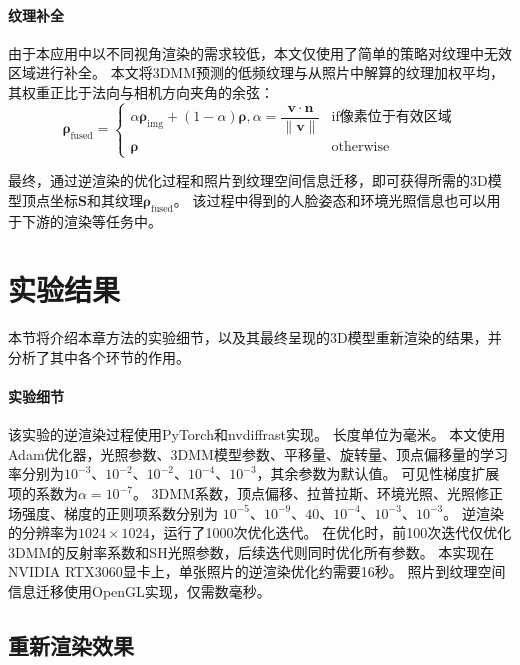 \paragraph{纹理补全}
由于本应用中以不同视角渲染的需求较低，本文仅使用了简单的策略对纹理中无效区域进行补全。
本文将3DMM预测的低频纹理与从照片中解算的纹理加权平均，其权重正比于法向与相机方向夹角的余弦：
\begin{equation}
\mathbf{\rho}_\mathrm{fused} = \begin{cases}
    \alpha \mathbf{\rho}_\mathrm{img} + (1-\alpha) \mathbf{\rho}, \alpha = \dfrac{\mathbf{v}\cdot\mathbf{n}}{\|\mathbf{v}\|} & \text{if像素位于有效区域} \\
\mathbf{\rho} & \text{otherwise}
\end{cases}
\label{eq:texture_fusion}
\end{equation}

最终，通过逆渲染的优化过程和照片到纹理空间信息迁移，即可获得所需的3D模型顶点坐标$\mathbf{S}$和其纹理$\mathbf{\rho}_\mathrm{fused}$。
该过程中得到的人脸姿态和环境光照信息也可以用于下游的渲染等任务中。

\section{实验结果}

本节将介绍本章方法的实验细节，以及其最终呈现的3D模型重新渲染的结果，并分析了其中各个环节的作用。

\paragraph{实验细节}
该实验的逆渲染过程使用PyTorch\citep{pytorch}和nvdiffrast实现。
长度单位为毫米。
本文使用Adam\citep{adam}优化器，光照参数、3DMM模型参数、平移量、旋转量、顶点偏移量的学习率分别为$10^{-3}$、$10^{-2}$、$10^{-2}$、$10^{-4}$、$10^{-3}$，其余参数为默认值。
可见性梯度扩展项的系数为$\alpha=10^{-7}$。
3DMM系数，顶点偏移、拉普拉斯、环境光照、光照修正场强度、梯度的正则项系数分别为
$10^{-5}$、$10^{-9}$、$40$、$10^{-4}$、$10^{-3}$、$10^{-3}$。
逆渲染的分辨率为$1024\times1024$，运行了1000次优化迭代。
在优化时，前100次迭代仅优化3DMM的反射率系数和SH光照参数，后续迭代则同时优化所有参数。
本实现在NVIDIA RTX3060显卡上，单张照片的逆渲染优化约需要16秒。
照片到纹理空间信息迁移使用OpenGL实现，仅需数毫秒。

\subsection{重新渲染效果}

